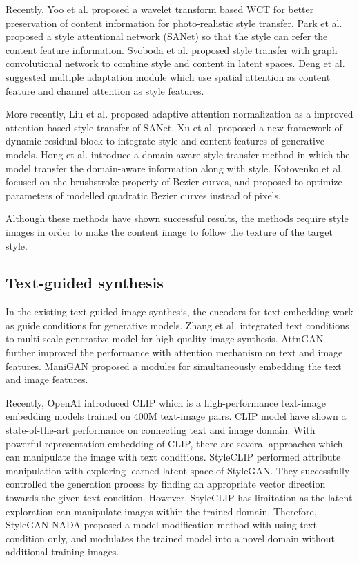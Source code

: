 \documentclass[10pt,twocolumn,letterpaper]{article}
\begin{document}
Recently, Yoo et al.\cite{yoo} proposed a wavelet transform based WCT for better preservation of content information for photo-realistic style transfer. Park et al.\cite{park} proposed a style attentional  network (SANet) so that the style can refer the content feature information. Svoboda et al.\cite{svoboda} proposed style transfer with graph convolutional network to combine style and content in latent spaces. Deng et al.\cite{deng} suggested multiple adaptation module which use spatial attention as content feature and channel attention as style features. 

More recently, %
Liu et al.\cite{liu} proposed adaptive attention normalization as a improved attention-based style transfer of SANet\cite{park}. Xu et al.\cite{xu} proposed a new framework of dynamic residual block to integrate style and content features of generative models. 
Hong et al.\cite{hong} introduce a domain-aware style transfer method in which the model transfer the domain-aware information along with style. Kotovenko et al.\cite{kotovenko} focused on the brushstroke property of Bezier curves, and proposed to optimize parameters of modelled quadratic Bezier curves instead of pixels.

Although these methods have shown successful results, the methods require style images in order to make the content image to follow the texture of the target style. %

\subsection{Text-guided synthesis}

In the existing text-guided image synthesis, %
the encoders for text embedding work as guide conditions for generative models. Zhang et al.\cite{zhang1,zhang2} integrated text conditions to multi-scale generative model for high-quality image synthesis. AttnGAN\cite{attngan} further improved the performance with attention mechanism on text and image features. ManiGAN\cite{manigan} proposed a modules for simultaneously embedding the text and image features. 

Recently, OpenAI introduced CLIP\cite{clip} which is a high-performance text-image embedding models trained on 400M text-image pairs. CLIP model have shown a state-of-the-art performance on connecting text and image domain. With powerful representation embedding of CLIP, there are several approaches which can manipulate the image with text conditions. StyleCLIP\cite{styleclip} performed attribute manipulation with exploring learned latent space of StyleGAN\cite{stylegan}. They successfully controlled the generation process  by finding an appropriate vector direction towards the given text condition. However, StyleCLIP has limitation as the latent exploration can manipulate images within the trained domain. Therefore, StyleGAN-NADA\cite{nada} proposed a model modification method with using text condition only, and modulates the trained model into a novel domain without additional training images.
\end{document}
